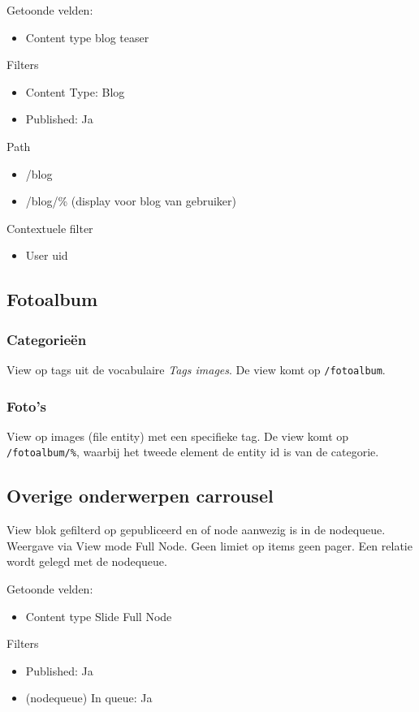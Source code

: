 Getoonde velden: 
\begin{itemize}
\item Content type blog teaser
\end{itemize}

Filters
\begin{itemize}
\item Content Type: Blog
\item Published: Ja
\end{itemize}

Path
\begin{itemize}
\item /blog
\item /blog/\% (display voor blog van gebruiker)
\end{itemize}

Contextuele filter
\begin{itemize}
\item User uid
\end{itemize}

\subsection{Fotoalbum}
\subsubsection{Categorie\"{e}n}
View op tags uit de vocabulaire \emph{Tags images}. De view komt op \texttt{/fotoalbum}.
\subsubsection{Foto's}
View op images (file entity) met een specifieke tag. De view komt op \texttt{/fotoalbum/\%}, waarbij het tweede element de entity id is van de categorie.


\subsection{Overige onderwerpen carrousel}
View blok gefilterd op gepubliceerd en of node aanwezig is in de nodequeue. Weergave via View mode Full Node. Geen limiet op items geen pager. Een relatie wordt gelegd met de nodequeue.

Getoonde velden: 
\begin{itemize}
\item Content type Slide Full Node
\end{itemize}

Filters
\begin{itemize}
\item Published: Ja
\item (nodequeue) In queue: Ja
\end{itemize}

